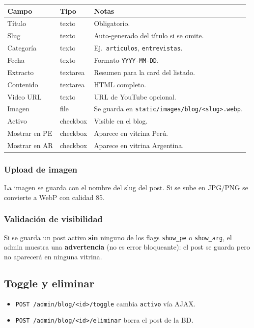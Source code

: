 \documentclass[11pt,a4paper]{article}
\begin{document}
\begin{longtable}{p{3.2cm} p{1.5cm} p{9cm}}
\toprule
\textbf{Campo} & \textbf{Tipo} & \textbf{Notas} \\
\midrule
\endhead
Título          & texto    & Obligatorio. \\
Slug            & texto    & Auto-generado del título si se omite. \\
Categoría       & texto    & Ej.\ \texttt{articulos}, \texttt{entrevistas}. \\
Fecha           & texto    & Formato \texttt{YYYY-MM-DD}. \\
Extracto        & textarea & Resumen para la card del listado. \\
Contenido       & textarea & HTML completo. \\
Video URL       & texto    & URL de YouTube opcional. \\
Imagen          & file     & Se guarda en \texttt{static/images/blog/<slug>.webp}. \\
Activo          & checkbox & Visible en el blog. \\
Mostrar en PE   & checkbox & Aparece en vitrina Perú. \\
Mostrar en AR   & checkbox & Aparece en vitrina Argentina. \\
\bottomrule
\end{longtable}

\subsubsection{Upload de imagen}

La imagen se guarda con el nombre del slug del post. Si se sube en
JPG/PNG se convierte a WebP con calidad 85.

\subsubsection{Validación de visibilidad}

Si se guarda un post activo \textbf{sin} ninguno de los flags
\texttt{show\_pe} o \texttt{show\_arg}, el admin muestra una
\textbf{advertencia} (no es error bloqueante): el post se guarda pero no
aparecerá en ninguna vitrina.

\subsection{Toggle y eliminar}

\begin{itemize}[leftmargin=*]
    \item \texttt{POST /admin/blog/<id>/toggle} cambia \texttt{activo}
        vía AJAX.
    \item \texttt{POST /admin/blog/<id>/eliminar} borra el post de la BD.
\end{itemize}
\end{document}
